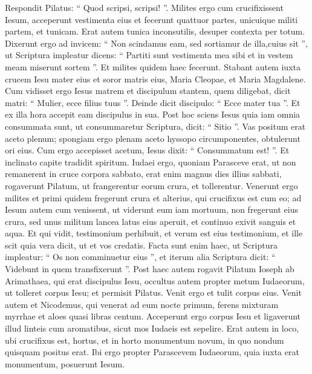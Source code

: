 \begin{biblechapter}
\begin{biblechapter}
\begin{biblechapter}
\begin{biblechapter}
\begin{biblechapter}
\begin{biblechapter}
\begin{biblechapter}
\begin{biblechapter}
\begin{biblechapter}
\begin{biblechapter}
\begin{biblechapter}
\begin{biblechapter}
\begin{biblechapter}
\begin{biblechapter}
\begin{biblechapter}
\begin{biblechapter}
\begin{biblechapter}
\begin{biblechapter}
\begin{biblechapter}
\verse Respondit Pilatus: “ Quod scripsi, scripsi! ”.
 \verse Milites ergo cum crucifixissent Iesum, acceperunt vestimenta eius et fecerunt quattuor partes, unicuique militi partem, et tunicam. Erat autem tunica inconsutilis, desuper contexta per totum. 
\verse Dixerunt ergo ad invicem: “ Non scindamus eam, sed sortiamur de illa,cuius sit ”, ut Scriptura impleatur dicens:
 “ Partiti sunt vestimenta mea sibi
 et in vestem meam miserunt sortem ”.
 Et milites quidem haec fecerunt.
 \verse Stabant autem iuxta crucem Iesu mater eius et soror matris eius, Maria Cleopae, et Maria Magdalene. 
\verse Cum vidisset ergo Iesus matrem et discipulum stantem, quem diligebat, dicit matri: “ Mulier, ecce filius tuus ”. 
\verse Deinde dicit discipulo: “ Ecce mater tua ”. Et ex illa hora accepit eam discipulus in sua.
 \verse Post hoc sciens Iesus quia iam omnia consummata sunt, ut consummaretur Scriptura, dicit: “ Sitio ”. 
\verse Vas positum erat aceto plenum; spongiam ergo plenam aceto hyssopo circumponentes, obtulerunt ori eius. 
\verse Cum ergo accepisset acetum, Iesus dixit: “ Consummatum est! ”. Et inclinato capite tradidit spiritum.
 \verse Iudaei ergo, quoniam Parasceve erat, ut non remanerent in cruce corpora sabbato, erat enim magnus dies illius sabbati, rogaverunt Pilatum, ut frangerentur eorum crura, et tollerentur. 
\verse Venerunt ergo milites et primi quidem fregerunt crura et alterius, qui crucifixus est cum eo; 
\verse ad Iesum autem cum venissent, ut viderunt eum iam mortuum, non fregerunt eius crura, 
 \verse sed unus militum lancea latus eius aperuit, et continuo exivit sanguis et aqua. 
\verse Et qui vidit, testimonium perhibuit, et verum est eius testimonium, et ille scit quia vera dicit, ut et vos credatis. 
\verse Facta sunt enim haec, ut Scriptura impleatur: “ Os non comminuetur eius ”, 
\verse et iterum alia Scriptura dicit: “ Videbunt in quem transfixerunt ”.
 \verse Post haec autem rogavit Pilatum Ioseph ab Arimathaea, qui erat discipulus Iesu, occultus autem propter metum Iudaeorum, ut tolleret corpus Iesu; et permisit Pilatus. Venit ergo et tulit corpus eius. 
\verse Venit autem et Nicodemus, qui venerat ad eum nocte primum, ferens mixturam myrrhae et aloes quasi libras centum. 
\verse Acceperunt ergo corpus Iesu et ligaverunt illud linteis cum aromatibus, sicut mos Iudaeis est sepelire. 
\verse Erat autem in loco, ubi crucifixus est, hortus, et in horto monumentum novum, in quo nondum quisquam positus erat. 
\verse Ibi ergo propter Parascevem Iudaeorum, quia iuxta erat monumentum, posuerunt Iesum.
 

\end{biblechapter}
\end{biblechapter}
\end{biblechapter}
\end{biblechapter}
\end{biblechapter}
\end{biblechapter}
\end{biblechapter}
\end{biblechapter}
\end{biblechapter}
\end{biblechapter}
\end{biblechapter}
\end{biblechapter}
\end{biblechapter}
\end{biblechapter}
\end{biblechapter}
\end{biblechapter}
\end{biblechapter}
\end{biblechapter}
\end{biblechapter}
